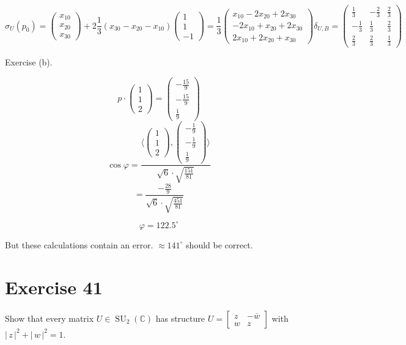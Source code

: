 \documentclass[a4paper]{article}
\theoremstyle{definition}
\newcommand\card[1]{\left|\,#1\,\right|}
\newcommand\ip[2]{\langle{#1},{#2}\rangle}
\begin{document}
\[
  \sigma_U(p_0) = \begin{pmatrix} x_{10} \\ x_{20} \\ x_{30} \end{pmatrix} + 2 \frac13 (x_{30} - x_{20} - x_{10}) \begin{pmatrix} 1 \\ 1 \\ -1 \end{pmatrix}
  = \frac13 \begin{pmatrix} x_{10} - 2x_{20} + 2x_{30} \\ -2x_{10} + x_{20} + 2x_{30} \\ 2x_{10} + 2x_{20} + x_{30} \end{pmatrix} \delta_{U,B} = \begin{pmatrix} \frac13 & -\frac23 & \frac23 \\ -\frac13 & \frac13 & \frac23 \\ \frac23 & \frac23 & \frac13 \end{pmatrix}
\]

Exercise (b).

\[
  p \cdot \begin{pmatrix} 1 \\ 1 \\ 2 \end{pmatrix} = \begin{pmatrix} -\frac{15}9 \\ -\frac{15}9 \\ \frac19 \end{pmatrix}
\] \[
  \cos\varphi = \frac{\ip{\begin{pmatrix} 1 \\ 1 \\ 2\end{pmatrix}}{\begin{pmatrix} -\frac19 \\ -\frac19 \\ \frac19 \end{pmatrix}}}{\sqrt6 \cdot \sqrt{\frac{151}{81}}}
\] \[
  = \frac{-\frac{28}{9}}{\sqrt6 \cdot \sqrt{\frac{451}{81}}}
\]

\[ \varphi = 122.5^\circ \]

But these calculations contain an error. $\approx 141^\circ$ should be correct.

\section*{Exercise 41}
\begin{ex}
  Show that every matrix $U \in \operatorname{SU}_2(\mathbb C)$ has structure $U = \begin{bmatrix} z & -\overline{w} \\ w & z \end{bmatrix}$ with $\card{z}^2 + \card{w}^2 = 1$.
\end{ex}
\end{document}
